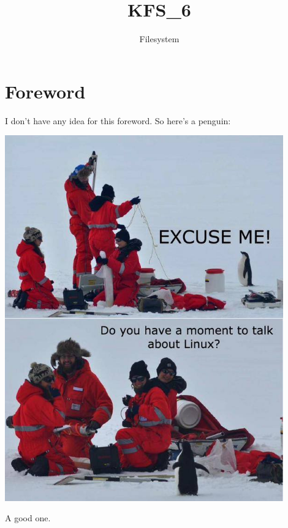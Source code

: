 \documentclass{42-en}
\begin{document}
                           \title{KFS\_6}
                          \subtitle{Filesystem}


\maketitle

\tableofcontents


\chapter{Foreword}
    I don't have any idea for this foreword. So here's a penguin:\\
    \centerline{\includegraphics[width=12cm]{oui.jpg}}
    A good one.
\end{document}
